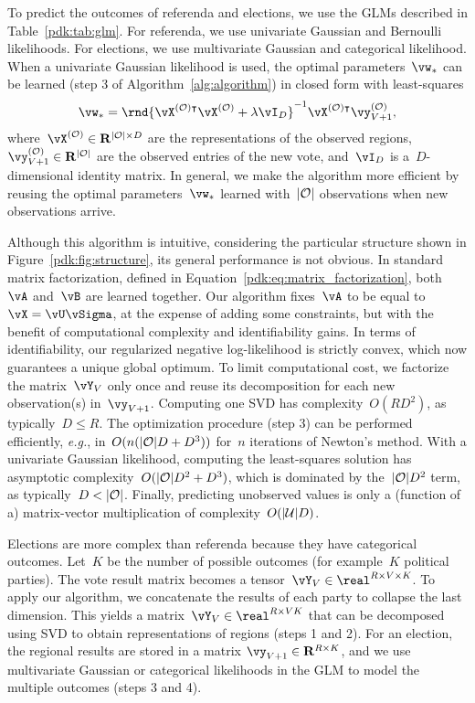 To predict the outcomes of referenda and elections, we use the GLMs described in Table~\ref{pdk:tab:glm}.
For referenda, we use univariate Gaussian and Bernoulli likelihoods.
For elections, we use multivariate Gaussian and categorical likelihood.
When a univariate Gaussian likelihood is used, the optimal parameters~$\vw_*$ can be learned (step 3 of Algorithm~\ref{alg:algorithm}) in closed form with least-squares
\begin{equation}
	\label{pdk:eq:least_squares}
	\vw_* = \rnd{\vX^{(\Obs)\intercal} \vX^{(\Obs)} + \lambda \vI_D }^{-1}\vX^{(\Obs)\intercal} \vy^{(\Obs)}_{V+1},
\end{equation}
where~$\vX^{(\Obs)} \in \mathbf{R}^{\vert \Obs \vert \times D}$ are the representations of the observed regions,~$\vy^{(\Obs)}_{V+1} \in \mathbf{R}^{\vert \Obs \vert}$ are the observed entries of the new vote, and~$\vI_D$ is a~$D$-dimensional identity matrix.
In general, we make the algorithm more efficient by reusing the optimal parameters~$\vw_*$ learned with~$\vert \mathcal{O} \vert$ observations when new observations arrive.

Although this algorithm is intuitive, considering the particular structure shown in Figure~\ref{pdk:fig:structure}, its general performance is not obvious.
In standard matrix factorization, defined in Equation~\eqref{pdk:eq:matrix_factorization}, both~$\vA$ and~$\vB$ are learned together.
Our algorithm fixes~$\vA$ to be equal to~$\vX = \vU \vSigma$, at the expense of adding some constraints, but with the benefit of computational complexity and identifiability gains.
In terms of identifiability, our regularized negative log-likelihood is strictly convex, which now guarantees a unique global optimum.
To limit computational cost, we factorize the matrix~$\vY_V$ only once and reuse its decomposition for each new observation(s) in~$\vy_{V+1}$.
Computing one SVD has complexity~$O(RD^2)$, as typically~$D \leq R$.
The optimization procedure (step 3) can be performed efficiently, \textit{e.g.}, in~$ O(n (\vert \mathcal{O} \vert D + D^3))$ for~$n$ iterations of Newton's method.
With a univariate Gaussian likelihood, computing the least-squares solution has asymptotic complexity~$O(\vert \mathcal{O} \vert D^2 + D^3)$, which is dominated by the~$\vert \mathcal{O} \vert D^2$ term, as typically~$D < \vert \mathcal{O} \vert$.
Finally, predicting unobserved values is only a (function of a) matrix-vector multiplication of complexity~$O(\vert \mathcal{U} \vert D)$.

Elections are more complex than referenda because they have categorical outcomes.
Let~$K$ be the number of possible outcomes (for example~$K$ political parties).
The vote result matrix becomes a tensor~$\vY_V \in \real^{R \times V \times K}$.
To apply our algorithm, we concatenate the results of each party to collapse the last dimension.
This yields a matrix~$\vY_V \in \real^{R \times VK}$ that can be decomposed using SVD to obtain representations of regions (steps 1 and 2).
For an election, the regional results are stored in a matrix \mbox{$\vy_{V+1} \in \mathbf{R}^{R \times K}$}, and we use multivariate Gaussian or categorical likelihoods in the GLM to model the multiple outcomes (steps 3 and 4).

